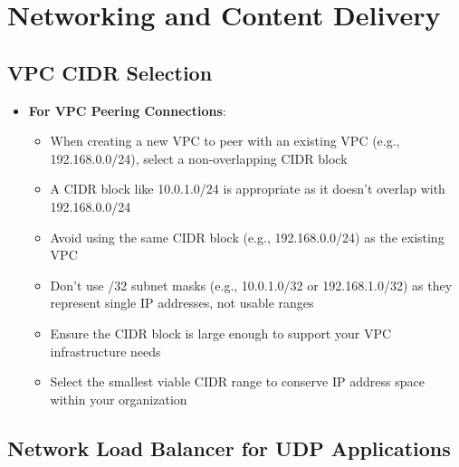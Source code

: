 \documentclass[11pt,a4paper]{report}
\begin{document}
\chapter{Networking and Content Delivery}



\section{VPC CIDR Selection}

\begin{itemize}
  \item \textbf{For VPC Peering Connections}:
\begin{itemize}
  \item When creating a new VPC to peer with an existing VPC (e.g., 192.168.0.0/24), select a non-overlapping CIDR block
  \item A CIDR block like 10.0.1.0/24 is appropriate as it doesn't overlap with 192.168.0.0/24
  \item Avoid using the same CIDR block (e.g., 192.168.0.0/24) as the existing VPC
  \item Don't use /32 subnet masks (e.g., 10.0.1.0/32 or 192.168.1.0/32) as they represent single IP addresses, not usable ranges
  \item Ensure the CIDR block is large enough to support your VPC infrastructure needs
  \item Select the smallest viable CIDR range to conserve IP address space within your organization
\end{itemize}
\end{itemize}


\section{Network Load Balancer for UDP Applications}
\end{document}
